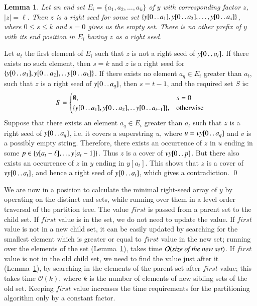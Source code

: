 \documentclass[preprint,12pt]{elsarticle}
\newcommand{\dd}{\mathinner{\ldotp\ldotp}}
\newcommand{\cO}{\ensuremath{\mathcal{O}}}
\newcommand{\firstvalue}{\ensuremath{\mathit{first}}}
\newtheorem{lemma}[theorem]{Lemma}
\newenvironment{proof}[1][Proof]{\begin{trivlist}
\item[\hskip \labelsep {\bfseries #1}]}{\end{trivlist}}
\begin{document}
\begin{lemma}
\label{lemma_rs in sets}
Let an end set $E_{i}=\{a_{1},a_{2},\dots,a_{k}\}$ of $y$ with corresponding factor $z$, $|z|=\ell$.
Then $z$ is a right seed for some set $\{y[0\dd a_{1}],y[0\dd a_{2}],\ldots,\\y[0 \dd a_{s}]\}$, where $0\leq s\leq k$ 
and $s=0$ gives us the empty set. There is no other prefix of $y$ with its end position in $E_{i}$ having $z$ as a right seed.
\end{lemma}
\begin{proof}
Let $a_{t}$ the first element of $E_{i}$ such that $z$ is not a right seed of $y[0 \dd a_{t}]$.
If there exists no such element, then $s=k$ and $z$ is a  right seed for  $\{y[0\dd a_{1}],y[0 \dd a_{2}], \dd y[0 \dd a_{k}]\}$.
If there exists no element $a_{q}\in E_{i}$ greater than $a_{t}$, such that $z$ is a  right seed of $y[0 \dd a_{q}]$,
then $s=t-1$, and the required set $S$ is:
 \begin{equation}S=
            \begin{cases}
             \emptyset, & s=0\\
	     \{y[0\dd a_{1}],y[0 \dd a_{2}], \dd y[0 \dd a_{t-1}]\}, & \text{otherwise}
            \end{cases}
  \end{equation}
Suppose that there exists an element $a_{q}\in E_{i}$ greater than $a_{t}$ such that $z$ is a  right seed of $y[0 \dd a_{q}]$,
i.e. it covers a superstring $u$, where $u=vy[0 \dd a_{q}]$ and $v$ is a possibly empty string. Therefore, there exists an occurrence of $z$
in $u$ ending in some $p\in \{y[a_{t}-\ell],\dd,y[a_{t}-1]\}$. Thus $z$ is a cover of $vy[0 \dd p]$. But there also exists an occurrence of
$z$ in $y$ ending in $y[a_{t}]$. This shows that $z$ is a cover of $vy[0 \dd a_{t}]$, and hence a  right seed
of $y[0 \dd a_{t}]$, which gives a contradiction. \hfill
\qed
\end{proof}

We are now in a position to calculate the minimal right-seed array of $y$ by operating on the distinct end sets, 
while running over them in a level order traversal of the partition tree. 
The value $\firstvalue$ is passed from a parent set to the child set. If $\firstvalue$ value is in the set, we do not need to update
the value. If $\firstvalue$ value is not in a new child set, it can be easily updated by searching for the smallest element which is greater
or equal to $\firstvalue$ value in the new set; running over the elements of the set (Lemma~\ref{lemma_rs in sets}),
takes time $\cO(\emph{size of the new set})$. If $\firstvalue$ value is not in the old child set, we need to find the value just after it
(Lemma~\ref{lemma_rs in sets}), by searching in the elements of the parent set after $\firstvalue$ value; this takes time $\cO(k)$,
where $k$ is the number of elements of new sibling sets of the old set. Keeping $\firstvalue$ value increases the time requirements
for the partitioning algorithm only by a constant factor.
\end{document}
